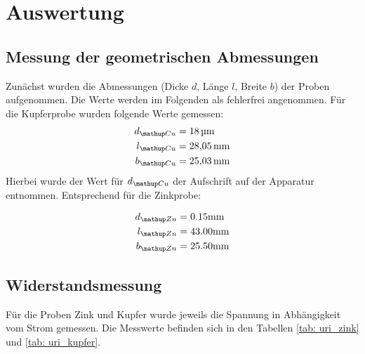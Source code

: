 \newpage

\section{Auswertung}

\subsection{Messung der geometrischen Abmessungen}
Zunächst wurden die Abmessungen (Dicke $d$, Länge $l$, Breite $b$) der Proben aufgenommen. Die Werte
werden im Folgenden als fehlerfrei angenommen. Für die Kupferprobe wurden folgende Werte gemessen:
\begin{align}
  \begin{aligned}
    d\ua{Cu} &= \SI{18}{\micro \meter} \\
    l\ua{Cu} &= \SI{28.05}{\milli \meter}\\
    b\ua{Cu} &= \SI{25.03}{\milli \meter}
        \label{eq: abmessungen_kupfer}
      \end{aligned}
\end{align}
Hierbei wurde der Wert für $d\ua{Cu}$ der Aufschrift auf der Apparatur entnommen.
Entsprechend für die Zinkprobe:

\begin{align}
  \begin{aligned}
    d\ua{Zn} &= 0.15 \si{\milli \meter} \\ %
    l\ua{Zn} &= 43.00 \si{\milli \meter}\\
    b\ua{Zn} &= 25.50 \si{\milli \meter}
        \label{eq: abmessungen_zink}
      \end{aligned}
\end{align}



\subsection{Widerstandsmessung}
Für die Proben Zink und Kupfer wurde jeweils die Spannung in Abhängigkeit vom Strom gemessen. Die Messwerte befinden sich
in den Tabellen \ref{tab: uri_zink} und \ref{tab: uri_kupfer}.

\begin{minipage}{\textwidth}

\hfill

\end{minipage}

